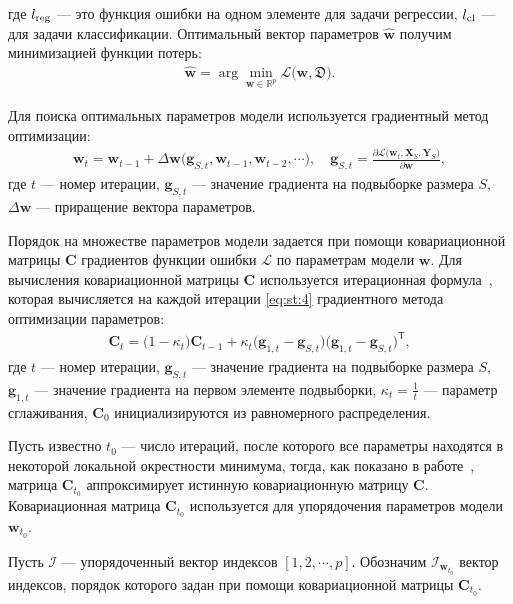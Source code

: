 где $l_{\text{\text{reg}}}$ --- это функция ошибки на одном элементе для задачи регрессии, $l_{\text{\text{cl}}}$ --- для задачи классификации.
Оптимальный вектор параметров $\hat{\textbf{w}}$ получим минимизацией функции потерь:
\[
\label{eq:st:0:1}
\begin{aligned}
\hat{\textbf{w}} = \arg \min_{\textbf{w}\in\mathbb{R}^{p}} \mathcal{L}\bigr(\textbf{w}, \mathfrak{D}\bigr).
\end{aligned}
\]

Для поиска оптимальных параметров модели используется градиентный метод оптимизации:
\[
\label{eq:st:4}
\begin{aligned}
\textbf{w}_{t} = \textbf{w}_{t-1} + \Delta\textbf{w}\bigr(\textbf{g}_{S,t}, \textbf{w}_{t-1}, \textbf{w}_{t-2}, \cdots\bigr), \quad \textbf{g}_{S,t}=\frac{\partial \mathcal{L}\bigr(\textbf{w}_{t}, \textbf{X}_{S}, \textbf{Y}_{S}\bigr)}{\partial \textbf{w}},
\end{aligned}
\]
где $t$ --- номер итерации, $\textbf{g}_{S,t}$ --- значение градиента на подвыборке размера $S$, $\Delta\textbf{w}$ --- приращение вектора параметров.
 
 
Порядок на множестве параметров модели задается при помощи ковариационной матрицы $\textbf{C}$ градиентов функции ошибки $\mathcal{L}$ по параметрам модели $\textbf{w}$. Для вычисления ковариационной матрицы $\textbf{C}$ используется итерационная формула~\cite{Chunyan2016}, которая вычисляется на каждой итерации \eqref{eq:st:4} градиентного метода оптимизации параметров:
\[
\label{eq:st:5}
\begin{aligned}
\textbf{C}_t = \bigr(1-\kappa_t\bigr)\textbf{C}_{t-1}+\kappa_t\bigr(\textbf{g}_{1,t}-\textbf{g}_{S,t}\bigr)\bigr(\textbf{g}_{1,t}-\textbf{g}_{S,t}\bigr)^{\mathsf{T}},
\end{aligned}
\]
 где $t$ --- номер итерации, $\textbf{g}_{S,t}$ --- значение градиента на подвыборке размера $S$, $\textbf{g}_{1,t}$ --- значение градиента на первом элементе подвыборки, $\kappa_t=\frac{1}{t}$ --- параметр сглаживания, $\textbf{C}_0$ инициализируются из равномерного распределения.
 
Пусть известно $t_0$ --- число итераций, после которого все параметры находятся в некоторой локальной окрестности минимума, тогда, как показано в работе~\cite{Chunyan2016}, матрица $\textbf{C}_{t_0}$ аппроксимирует истинную ковариационную матрицу $\textbf{C}$. Ковариационная матрица $\textbf{C}_{t_0}$ используется для упорядочения параметров модели $\textbf{w}_{t_0}$. 
 
Пусть $\mathcal{I}$ ---  упорядоченный вектор индексов $[1, 2, \cdots, p]$. Обозначим $\mathcal{I}_{\textbf{w}_{t_0}}$ вектор индексов, порядок которого задан при помощи ковариационной матрицы $\textbf{C}_{t_0}$. 
 
